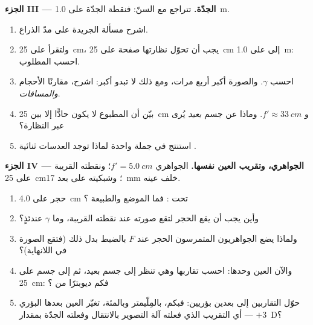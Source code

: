 \begin{problem}
\medskip
\noindent\textbf{الجزء III --- الجدّة.}
تتراجع  مع السنّ: فنقطة الجدّة على \qty{1.0}{m}.
\begin{enumerate}[resume]
  \item اشرح مسألة الجريدة على مدّ الذراع.
  \item ولتقرأ على \qty{25}{cm}، يجب أن تحوّل نظارتها صفحة على
        \qty{25}{cm} إلى  على \qty{1.0}{m}: احسب
         المطلوب.
  \item احسب $\gamma$. والصورة أكبر أربع مرات، ومع ذلك لا تبدو
        أكبر: اشرح، مقارنًا الأحجام \emph{والمسافات}.
  \item بيّن أن المطبوع لا يكون حادًّا إلا بين \qty{25}{cm} و
        $f' \approx \qty{33}{cm}$. وماذا عن جسم \emph{بعيد} يُرى
        عبر النظارة؟
  \item استنتج في جملة واحدة لماذا توجد العدسات ثنائية .
\end{enumerate}

\medskip
\noindent\textbf{الجزء IV --- الجواهري، وتقريب العين نفسها.}
 الجواهري $f' = \qty{5.0}{cm}$؛ ونقطته القريبة على
\qty{25}{cm}؛ وشبكيته على بعد \qty{17}{mm} خلف  عينه.
\begin{enumerate}[resume]
  \item حجر على \qty{4.0}{cm} تحت : فما الموضع والطبيعة
        ؟
  \item وأين يجب أن يقع الحجر لتقع صورته عند نقطته
        القريبة، وما $\gamma$ عندئذٍ؟
  \item ولماذا يضع الجواهريون المتمرسون الحجر عند $F$ بالضبط
        بدل ذلك (فتقع الصورة في اللانهاية)؟
  \item والآن العين وحدها: احسب تقاربها وهي تنظر إلى جسم
        بعيد، ثم إلى جسم على \qty{25}{cm}: فكم ديوبترًا من
        ؟
  \item حوّل التقاربين إلى بعدين بؤريين: فبكم، بالمِلّيمتر
        وبالمئة، تغيّر العين بعدها البؤري
        --- أي التقريب الذي فعلته آلة التصوير بالانتقال وفعلته الجدّة
        بمقدار $+3$~D؟
\end{enumerate}
\end{problem}
